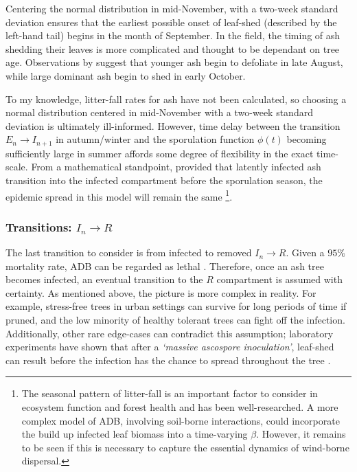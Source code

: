 Centering the normal distribution in mid-November, with a two-week standard deviation ensures that the earliest possible onset of leaf-shed (described by the left-hand tail) begins in the month of September.
In the field, the timing of ash shedding their leaves is more complicated and thought to be dependant on tree age. 
Observations by \cite{hietala2013invasive} suggest that younger ash begin to defoliate in late August, while large dominant ash begin to shed in early October.

To my knowledge, litter-fall rates for ash have not been calculated,
so choosing a normal distribution centered in mid-November with a two-week standard deviation is ultimately ill-informed. 
However, time delay between the transition $E_n \rightarrow I_{n+1}$ in autumn/winter and the sporulation function $\phi(t)$ becoming sufficiently large in summer affords some degree of flexibility in the exact time-scale.
From a mathematical standpoint, provided that latently infected ash transition into the infected compartment before the sporulation season, 
the epidemic spread in this model will remain the same
\footnote{The seasonal pattern of litter-fall is an important factor to consider in ecosystem function and forest health and has been well-researched. 
A more complex model of ADB, involving soil-borne interactions, could incorporate the build up infected leaf biomass into a time-varying $\beta$. 
However, it remains to be seen if this is necessary to capture the essential dynamics of wind-borne dispersal.}. 

\subsubsection{Transitions: $I_n\rightarrow R$}

The last transition to consider is from infected to removed $I_{n}\rightarrow R$. Given a $95\%$ mortality rate, ADB can be regarded as lethal \cite{ash-dieback-costs}.
Therefore, once an ash tree becomes infected, an eventual transition to the $R$ compartment is assumed with certainty.
As mentioned above, the picture is more complex in reality. 
For example, stress-free trees in urban settings can survive for long periods of time if pruned, and the low minority of healthy tolerant trees can fight off the infection.
Additionally, other rare edge-cases can contradict this assumption;
laboratory experiments have shown that after a \textit{`massive ascospore inoculation'}, leaf-shed can result before the infection has the chance to spread throughout the tree \cite{https://doi.org/10.1111/mpp.12073}.

